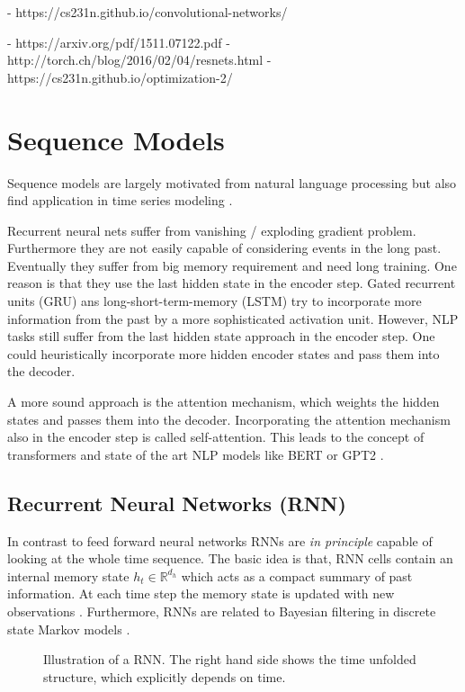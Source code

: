 \documentclass[12pt,a4paper]{article}
\begin{document}
- https://cs231n.github.io/convolutional-networks/

- https://arxiv.org/pdf/1511.07122.pdf 
- http://torch.ch/blog/2016/02/04/resnets.html
- https://cs231n.github.io/optimization-2/

\section{Sequence Models}
Sequence models are largely motivated from natural language processing but also find application in time series modeling \cite{DBLP:journals/corr/FlunkertSG17, lim2020time, NEURIPS2018_5cf68969, wang2019deep, lim2020recurrent}.

Recurrent neural nets suffer from vanishing / exploding gradient problem. Furthermore they are not easily capable of considering events in the long past.  Eventually they suffer from big memory requirement and need long training. One reason is that they use the last hidden state in the encoder step. Gated recurrent units (GRU) ans long-short-term-memory (LSTM) try to incorporate more information from the past by a more sophisticated activation unit. However, NLP tasks still suffer from the last hidden state approach in the encoder step. One could heuristically incorporate more hidden encoder states and pass them into the decoder. 

A more sound approach is the  attention mechanism\cite{bahdanau2016neural, luong2015effective}, which weights the hidden states and passes them into the decoder. Incorporating the attention mechanism also in the encoder step is called self-attention. This leads to the concept of transformers \cite{vaswani2017attention, illustratedtransformer} and state of the art  NLP models like BERT \cite{DBLP:journals/corr/abs-1810-04805}  or GPT2 \cite{radford2019language, illustratedgpt2}.

\subsection{Recurrent Neural Networks (RNN)}
In contrast to feed forward neural networks RNNs are \textit{in principle} capable of looking at the whole time sequence. The basic idea is that, RNN cells contain an internal memory state $h_t \in \mathbb R^{d_h}$  which acts as a compact summary of past information. At each time step the memory state is updated with new observations \cite{salehinejad2018recent, lim2020time}.
Furthermore,  RNNs are related to Bayesian filtering in discrete state Markov models \cite{lim2020recurrent, barber}.  
\begin{figure}
	
	\caption{Illustration of a RNN. The right hand side shows  the time unfolded structure, which explicitly depends on time.}
	\label{fig:rnn}
\end{figure}
\end{document}
